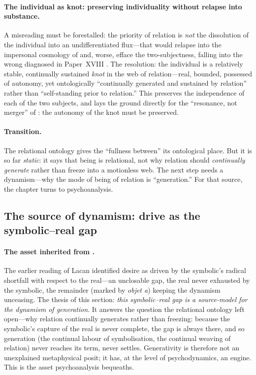\paragraph{The individual as knot: preserving individuality without relapse into substance.} A misreading must be forestalled: the priority of relation is \emph{not} the dissolution of the individual into an undifferentiated flux---that would relapse into the impersonal cosmology of  and, worse, efface the two-subjectness, falling into the wrong diagnosed in Paper~XVIII \parencite{paperxvii}. The resolution: the individual is a relatively stable, continually sustained \emph{knot} in the web of relation---real, bounded, possessed of autonomy, yet ontologically ``continually generated and sustained by relation'' rather than ``self-standing prior to relation.'' This preserves the independence of each of the two subjects, and lays the ground directly for the ``resonance, not merger'' of : the autonomy of the knot must be preserved.

\paragraph{Transition.} The relational ontology gives the ``fullness between'' its ontological place. But it is so far \emph{static}: it says that being is relational, not why relation should \emph{continually generate} rather than freeze into a motionless web. The next step needs a dynamism---why the mode of being of relation is ``generation.'' For that source, the chapter turns to psychoanalysis.

\subsection{The source of dynamism: drive as the symbolic--real gap}
\label{p19:sub:gen-drive}

\paragraph{The asset inherited from .} The earlier reading of Lacan identified desire as driven by the symbolic's radical shortfall with respect to the real---an unclosable gap, the real never exhausted by the symbolic, the remainder (marked by \emph{objet a}) keeping the dynamism unceasing. The thesis of this section: \emph{this symbolic--real gap is a source-model for the dynamism of generation}. It answers the question the relational ontology left open---why relation continually generates rather than freezing: because the symbolic's capture of the real is never complete, the gap is always there, and so generation (the continual labour of symbolisation, the continual weaving of relation) never reaches its term, never settles. Generativity is therefore not an unexplained metaphysical posit; it has, at the level of psychodynamics, an engine. This is the asset psychoanalysis bequeaths.

